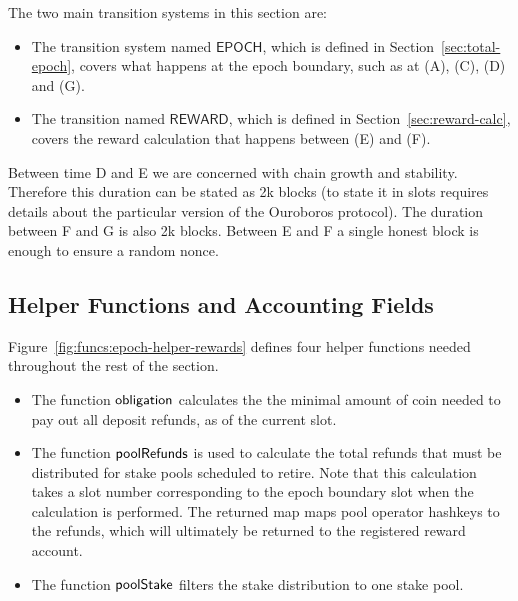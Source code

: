 The two main transition systems in this section are:
\begin{itemize}
  \item The transition system named $\mathsf{EPOCH}$, which is defined in
    Section~\ref{sec:total-epoch}, covers what happens at the epoch boundary,
    such as at (A), (C), (D) and (G).
  \item The transition named $\mathsf{REWARD}$, which is defined in Section~\ref{sec:reward-calc},
    covers the reward calculation that happens between (E) and (F).
\end{itemize}


\begin{note}
  Between time D and E we are concerned with chain growth and stability.
  Therefore this duration can be stated as 2k blocks (to state it in slots requires details about
  the particular version of the Ouroboros protocol). The duration between F and G is also 2k blocks.
  Between E and F a single honest block is enough to ensure a random nonce.
\end{note}

\subsection{Helper Functions and Accounting Fields}
\label{sec:stake-dist-helpers}

Figure~\ref{fig:funcs:epoch-helper-rewards} defines four helper functions needed
throughout the rest of the section.

\begin{itemize}
  \item The function $\mathsf{obligation}$ calculates the the minimal amount of coin needed to
    pay out all deposit refunds, as of the current slot.
  \item The function $\mathsf{poolRefunds}$ is used to calculate the total refunds
    that must be distributed for stake pools scheduled to retire.
    Note that this calculation takes a slot number corresponding to the epoch boundary slot
    when the calculation is performed.  The returned map maps pool operator hashkeys to the
    refunds, which will ultimately be returned to the registered reward account.
  \item The function $\mathsf{poolStake}$ filters the stake distribution to one stake pool.
\end{itemize}


